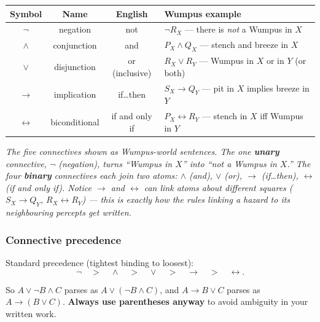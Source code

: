 \documentclass[11pt, a4paper]{article}
\newcommand{\thead}[1]{\textbf{#1}}
\begin{document}
\begin{center}
\renewcommand{\arraystretch}{1.25}
\begin{tabular}{@{}cccp{6.5cm}@{}}
\toprule
\thead{Symbol} & \thead{Name} & \thead{English} & \thead{Wumpus example} \\
\midrule
$\neg$         & negation     & not         & $\neg R_X$ — there is \emph{not} a Wumpus in $X$ \\
$\land$        & conjunction  & and         & $P_X \land Q_X$ — stench and breeze in $X$ \\
$\lor$         & disjunction  & or (inclusive) & $R_X \lor R_Y$ — Wumpus in $X$ or in $Y$ (or both) \\
$\rightarrow$  & implication  & if\dots then & $S_X \rightarrow Q_Y$ — pit in $X$ implies breeze in $Y$ \\
$\leftrightarrow$ & biconditional & if and only if & $P_X \leftrightarrow R_Y$ — stench in $X$ iff Wumpus in $Y$ \\
\bottomrule
\end{tabular}
\end{center}

\begin{center}

\footnotesize\textit{The five connectives shown as Wumpus-world sentences. The one \textbf{unary} connective, $\neg$ (negation), turns ``Wumpus in $X$'' into ``\emph{not} a Wumpus in $X$.'' The four \textbf{binary} connectives each join two atoms: $\land$ (and), $\lor$ (or), $\rightarrow$ (if\dots then), $\leftrightarrow$ (if and only if). Notice $\rightarrow$ and $\leftrightarrow$ can link atoms about \emph{different} squares ($S_X \rightarrow Q_Y$, $R_X \leftrightarrow R_Y$) — this is exactly how the rules linking a hazard to its neighbouring percepts get written.}
\end{center}

\subsubsection*{Connective precedence}

Standard precedence (tightest binding to loosest):
\[
\neg \quad > \quad \land \quad > \quad \lor \quad > \quad \rightarrow \quad > \quad \leftrightarrow.
\]

So $A \lor \neg B \land C$ parses as $A \lor (\neg B \land C)$, and $A \rightarrow B \lor C$ parses as $A \rightarrow (B \lor C)$. \textbf{Always use parentheses anyway} to avoid ambiguity in your written work.
\end{document}
